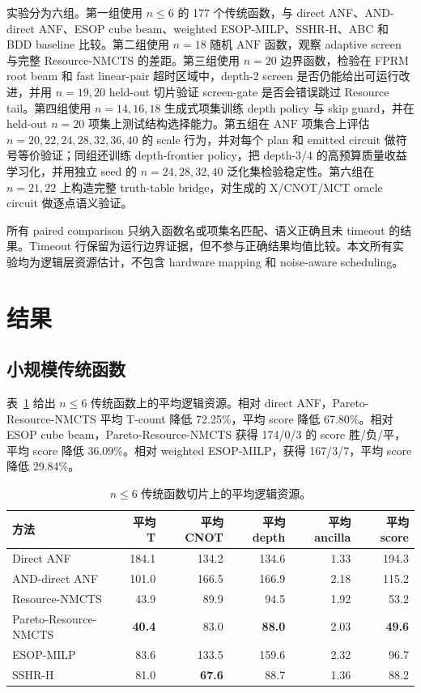 \documentclass[UTF8,fontset=macnew,11pt]{ctexart}
\newcommand{\method}{Resource-NMCTS}
\newcommand{\anf}{\ensuremath{\mathrm{ANF}}}
\newcommand{\ttable}{truth-table}
\begin{document}
实验分为六组。第一组使用 $n\leq6$ 的 177 个传统函数，与 direct ANF、AND-direct ANF、ESOP cube beam、weighted ESOP-MILP、SSHR-H、ABC 和 BDD baseline 比较。第二组使用 $n=18$ 随机 \anf{} 函数，观察 adaptive screen 与完整 \method{} 的差距。第三组使用 $n=20$ 边界函数，检验在 FPRM root beam 和 fast linear-pair 超时区域中，depth-2 screen 是否仍能给出可运行改进，并用 $n=19,20$ held-out 切片验证 screen-gate 是否会错误跳过 Resource tail。第四组使用 $n=14,16,18$ 生成式项集训练 depth policy 与 skip guard，并在 held-out $n=20$ 项集上测试结构选择能力。第五组在 \anf{} 项集合上评估 $n=20,22,24,28,32,36,40$ 的 scale 行为，并对每个 plan 和 emitted circuit 做符号等价验证；同组还训练 depth-frontier policy，把 depth-3/4 的高预算质量收益学习化，并用独立 seed 的 $n=24,28,32,40$ 泛化集检验稳定性。第六组在 $n=21,22$ 上构造完整 \ttable{} bridge，对生成的 X/CNOT/MCT oracle circuit 做逐点语义验证。

所有 paired comparison 只纳入函数名或项集名匹配、语义正确且未 timeout 的结果。Timeout 行保留为运行边界证据，但不参与正确结果均值比较。本文所有实验均为逻辑层资源估计，不包含 hardware mapping 和 noise-aware scheduling。

\section{结果}

\subsection{小规模传统函数}

表~\ref{tab:traditional} 给出 $n\leq6$ 传统函数上的平均逻辑资源。相对 direct ANF，Pareto-\method{} 平均 T-count 降低 72.25\%，平均 score 降低 67.80\%。相对 ESOP cube beam，Pareto-\method{} 获得 174/0/3 的 score 胜/负/平，平均 score 降低 36.09\%。相对 weighted ESOP-MILP，获得 167/3/7，平均 score 降低 29.84\%。

\begin{table}[t]
\centering
\small
\caption{$n\leq6$ 传统函数切片上的平均逻辑资源。}
\label{tab:traditional}
\begin{tabular}{lrrrrr}
\toprule
方法 & 平均 T & 平均 CNOT & 平均 depth & 平均 ancilla & 平均 score \\
\midrule
Direct ANF & 184.1 & 134.2 & 134.6 & 1.33 & 194.3 \\
AND-direct ANF & 101.0 & 166.5 & 166.9 & 2.18 & 115.2 \\
\method{} & 43.9 & 89.9 & 94.5 & 1.92 & 53.2 \\
Pareto-\method{} & \textbf{40.4} & 83.0 & \textbf{88.0} & 2.03 & \textbf{49.6} \\
ESOP-MILP & 83.6 & 133.5 & 159.6 & 2.32 & 96.7 \\
SSHR-H & 81.0 & \textbf{67.6} & 88.7 & 1.36 & 88.2 \\
\bottomrule
\end{tabular}
\end{table}
\end{document}

